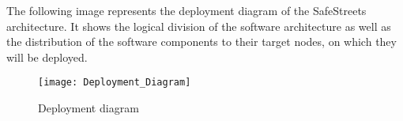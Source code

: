 The following image represents the deployment diagram of the SafeStreets architecture. It shows the logical division of the software architecture as well as the distribution of the software components to their target nodes, on which they will be deployed.

\begin{figure}[H]
  \centering
  \texttt{[image: Deployment\_Diagram]}
  \caption{Deployment diagram}
  \label{fig:deployment_diag}
\end{figure}
